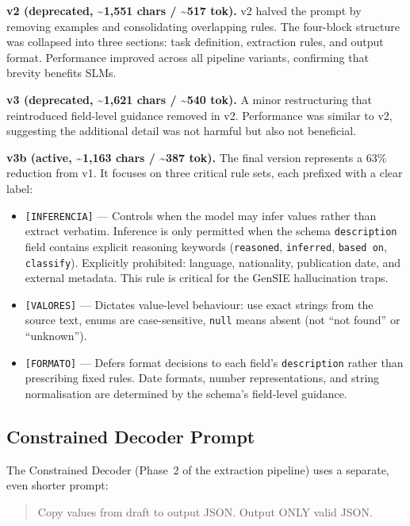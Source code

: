 \documentclass{ceurart}
\begin{document}
\textbf{v2 (deprecated, {\textasciitilde}1,551 chars / {\textasciitilde}517 tok).}
v2 halved the prompt by removing examples and consolidating overlapping rules.
The four-block structure was collapsed into three sections: task definition, extraction
rules, and output format.
Performance improved across all pipeline variants, confirming that brevity benefits
SLMs.

\textbf{v3 (deprecated, {\textasciitilde}1,621 chars / {\textasciitilde}540 tok).}
A minor restructuring that reintroduced field-level guidance removed in v2.
Performance was similar to v2, suggesting the additional detail was not harmful but
also not beneficial.

\textbf{v3b (active, {\textasciitilde}1,163 chars / {\textasciitilde}387 tok).}
The final version represents a 63\% reduction from v1.
It focuses on three critical rule sets, each prefixed with a clear label:

\begin{itemize}
\item \texttt{[INFERENCIA]} --- Controls when the model may infer values rather than
  extract verbatim.
  Inference is only permitted when the schema \texttt{description} field contains
  explicit reasoning keywords (\texttt{reasoned}, \texttt{inferred}, \texttt{based on},
  \texttt{classify}).
  Explicitly prohibited: language, nationality, publication date, and external
  metadata.
  This rule is critical for the GenSIE hallucination traps.
\item \texttt{[VALORES]} --- Dictates value-level behaviour: use exact strings from the
  source text, enums are case-sensitive, \texttt{null} means absent (not ``not found''
  or ``unknown'').
\item \texttt{[FORMATO]} --- Defers format decisions to each field's
  \texttt{description} rather than prescribing fixed rules.
  Date formats, number representations, and string normalisation are determined by the
  schema's field-level guidance.
\end{itemize}

\subsection{Constrained Decoder Prompt}

The Constrained Decoder (Phase~2 of the extraction pipeline) uses a separate, even
shorter prompt:

\begin{quote}
Copy values from draft to output JSON. Output ONLY valid JSON.
\end{quote}
\end{document}
